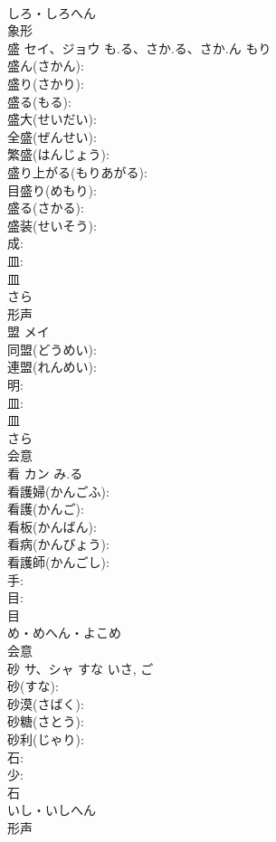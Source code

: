 \documentclass[8pt]{extreport}
\begin{document}
\begin{CJK}{UTF8}{min}
\\	しろ・しろへん	
\\	象形 
\\	盛	セイ、ジョウ	も.る、さか.る、さか.ん	もり	
\\	盛ん(さかん): 
\\	盛り(さかり): 
\\	盛る(もる): 
\\	盛大(せいだい): 
\\	全盛(ぜんせい): 
\\	繁盛(はんじょう): 
\\	盛り上がる(もりあがる): 
\\	目盛り(めもり): 
\\	盛る(さかる): 
\\	盛装(せいそう): 
\\	成: 
\\	皿: 
\\	皿	
\\	さら	
\\	形声 
\\	盟	メイ			
\\	同盟(どうめい): 
\\	連盟(れんめい): 
\\	明: 
\\	皿: 
\\	皿	
\\	さら	
\\	会意 
\\	看	カン	み.る		
\\	看護婦(かんごふ): 
\\	看護(かんご): 
\\	看板(かんばん): 
\\	看病(かんびょう): 
\\	看護師(かんごし): 
\\	手: 
\\	目: 
\\	目	
\\	め・めへん・よこめ	
\\	会意 
\\	砂	サ、シャ	すな	いさ, ご	
\\	砂(すな): 
\\	砂漠(さばく): 
\\	砂糖(さとう): 
\\	砂利(じゃり): 
\\	石: 
\\	少: 
\\	石	
\\	いし・いしへん	
\\	形声 

\end{CJK}
\end{document}
